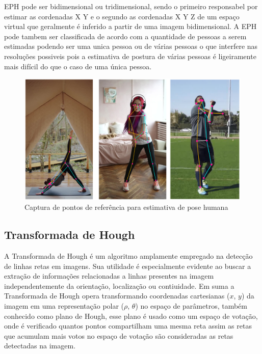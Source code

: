 \ac{EPH} pode ser bidimensional ou tridimensional, sendo o primeiro responsabel por estimar as cordenadas X Y e o segundo as cordenadas X Y Z de um espaço virtual que geralmente é inferido a partir de uma imagem bidimensional. A \ac{EPH} pode tambem ser classificada de acordo com a quantidade de pessoas a serem estimadas podendo ser uma unica pessoa ou de várias pessoas o que interfere nas resoluções possiveis pois a estimativa de postura de várias pessoas é ligeiramente mais difícil do que o caso de uma única pessoa.\cite{edhDeep}

\begin{figure}[!htb]
	\centering
	\includegraphics[scale=0.25]{figuras/eph/keypoint.jpg}
	\caption{Captura de pontos de referência para estimativa de pose humana}
	\label{fig:Captura de pontos de referencia para estimativa de pose humana}
\end{figure}





\subsection[Transformada de Hough]{Transformada de Hough}\label{sec:Transformada de Hough}


A Transformada de Hough é um algoritmo amplamente empregado na detecção de linhas retas em imagens. Sua utilidade é especialmente evidente ao buscar a extração de informações relacionadas a linhas presentes na imagem independentemente da orientação, localização ou contiuidade. Em suma a Transformada de Hough opera transformando coordenadas cartesianas ($x$, $y$) da imagem em uma representação polar ($\rho$, $\theta$) no espaço de parâmetros, também conhecido como plano de Hough, esse plano é usado como um espaço de votação, onde é verificado quantos pontos compartilham uma mesma reta assim as retas que acumulam mais votos no espaço de votação são consideradas as retas detectadas na imagem\cite{transformadaHough1}.


